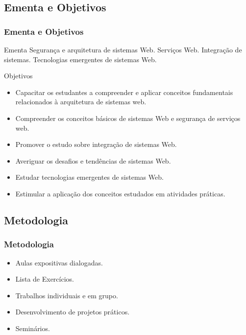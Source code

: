 \documentclass[
	10pt, %
	t, %
]{beamer}
\begin{document}

\subsection{Ementa e Objetivos}

\begin{frame}
	\frametitle{Ementa e Objetivos}

	\begin{block}{Ementa}
		Segurança e arquitetura de sistemas Web. Serviços Web. Integração de sistemas. Tecnologias emergentes de sistemas Web. 
	\end{block}

	\begin{block}{Objetivos}
		\begin{itemize}
			\item Capacitar os estudantes a compreender e aplicar conceitos fundamentais relacionados à arquitetura de sistemas web.
			\item Compreender os conceitos básicos de sistemas Web e segurança de serviços web.
			\item Promover o estudo sobre integração de sistemas Web.
			\item Averiguar os desafios e tendências de sistemas Web.
			\item Estudar tecnologias emergentes de sistemas Web.
			\item Estimular a aplicação dos conceitos estudados em atividades práticas.
		\end{itemize}
	\end{block}
	
\end{frame}


\subsection{Metodologia}

\begin{frame}
	\frametitle{Metodologia}

	\begin{itemize}
		\item Aulas expositivas dialogadas.
		\item Lista de Exercícios.
		\item Trabalhos individuais e em grupo.
		\item Desenvolvimento de projetos práticos.
		\item Seminários.
	\end{itemize}
	
\end{frame}
\end{document}
